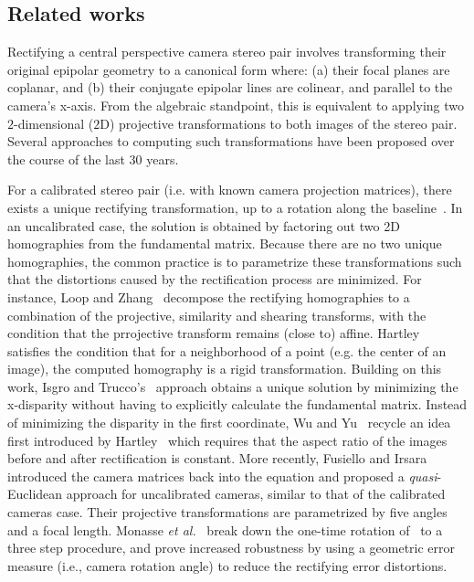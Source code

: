 \documentclass{ipol}
\begin{document}
\subsection{Related works}
Rectifying a central perspective camera stereo pair involves transforming their original epipolar geometry to a canonical form where: (a) their focal planes are coplanar, and (b) their conjugate epipolar lines are colinear, and parallel to the camera's x-axis. 
From the algebraic standpoint, this is equivalent to applying two $2$-dimensional ($2$D) projective transformations to both images of the stereo pair. Several approaches to computing such transformations have been proposed over the course of the last 30 years.

For a calibrated stereo pair (i.e. with known camera projection matrices), there exists a unique rectifying transformation, up to a rotation along the baseline~\cite{fusiello2000epi}. In an uncalibrated case, the solution is obtained by factoring out two 2D homographies from the fundamental matrix. Because there are no two unique homographies, the common practice is to parametrize these transformations such that the distortions caused by the rectification process are minimized. For instance, Loop and Zhang~\cite{loop1999epi} decompose the rectifying homographies to a combination of the projective, similarity and shearing transforms, with the condition that the prrojective transform remains (close to) affine. Hartley~\cite{hartley1999epi} satisfies the condition that for a neighborhood of a point (e.g. the center of an image), the computed homography is a rigid transformation. Building on this work, Isgro and Trucco's~\cite{isgro1999epi} approach obtains a unique solution by minimizing the x-disparity without having to explicitly calculate the fundamental matrix. Instead of minimizing the disparity in the first coordinate, Wu and Yu~\cite{wu2005epi} recycle an idea first introduced by Hartley~\cite{hartley1999epi} which requires that the aspect ratio of the images before and after rectification is constant. More recently, Fusiello and Irsara~\cite{fusiello2008epi} introduced the camera matrices back into the equation and proposed a \textit{quasi}-Euclidean approach for uncalibrated cameras, similar to that of the calibrated cameras case. Their projective transformations are parametrized by five angles and a focal length. Monasse \textit{et al.}~\cite{monasse2010epi} break down the one-time rotation of~\cite{fusiello2008epi} to a three step procedure, and prove increased robustness by using a geometric error measure (i.e., camera rotation angle) to reduce the rectifying error distortions.
\end{document}
